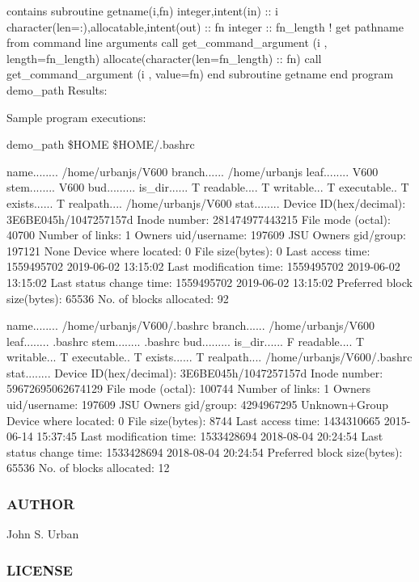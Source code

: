 contains subroutine getname(i,fn) integer,intent(in) \+:\+: i character(len=\+:),allocatable,intent(out) \+:\+: fn integer \+:\+: fn\+\_\+length ! get pathname from command line arguments call get\+\_\+command\+\_\+argument (i , length=fn\+\_\+length) allocate(character(len=fn\+\_\+length) \+:\+: fn) call get\+\_\+command\+\_\+argument (i , value=fn) end subroutine getname end program demo\+\_\+path Results\+:

Sample program executions\+:

demo\+\_\+path \$\+H\+O\+ME \$\+H\+O\+ME/.bashrc

name........ /home/urbanjs/\+V600 branch...... /home/urbanjs leaf........ V600 stem........ V600 bud......... is\+\_\+dir...... T readable.... T writable... T executable.. T exists...... T realpath.... /home/urbanjs/\+V600 stat........ Device ID(hex/decimal)\+: 3\+E6\+B\+E045h/1047257157d Inode number\+: 281474977443215 File mode (octal)\+: 40700 Number of links\+: 1 Owner\textquotesingle{}s uid/username\+: 197609 J\+SU Owner\textquotesingle{}s gid/group\+: 197121 None Device where located\+: 0 File size(bytes)\+: 0 Last access time\+: 1559495702 2019-\/06-\/02 13\+:15\+:02 Last modification time\+: 1559495702 2019-\/06-\/02 13\+:15\+:02 Last status change time\+: 1559495702 2019-\/06-\/02 13\+:15\+:02 Preferred block size(bytes)\+: 65536 No. of blocks allocated\+: 92

name........ /home/urbanjs/\+V600/.bashrc branch...... /home/urbanjs/\+V600 leaf........ .bashrc stem........ .bashrc bud......... is\+\_\+dir...... F readable.... T writable... T executable.. T exists...... T realpath.... /home/urbanjs/\+V600/.bashrc stat........ Device ID(hex/decimal)\+: 3\+E6\+B\+E045h/1047257157d Inode number\+: 59672695062674129 File mode (octal)\+: 100744 Number of links\+: 1 Owner\textquotesingle{}s uid/username\+: 197609 J\+SU Owner\textquotesingle{}s gid/group\+: 4294967295 Unknown+\+Group Device where located\+: 0 File size(bytes)\+: 8744 Last access time\+: 1434310665 2015-\/06-\/14 15\+:37\+:45 Last modification time\+: 1533428694 2018-\/08-\/04 20\+:24\+:54 Last status change time\+: 1533428694 2018-\/08-\/04 20\+:24\+:54 Preferred block size(bytes)\+: 65536 No. of blocks allocated\+: 12

\subsubsection*{A\+U\+T\+H\+OR}

John S. Urban

\subsubsection*{L\+I\+C\+E\+N\+SE}

